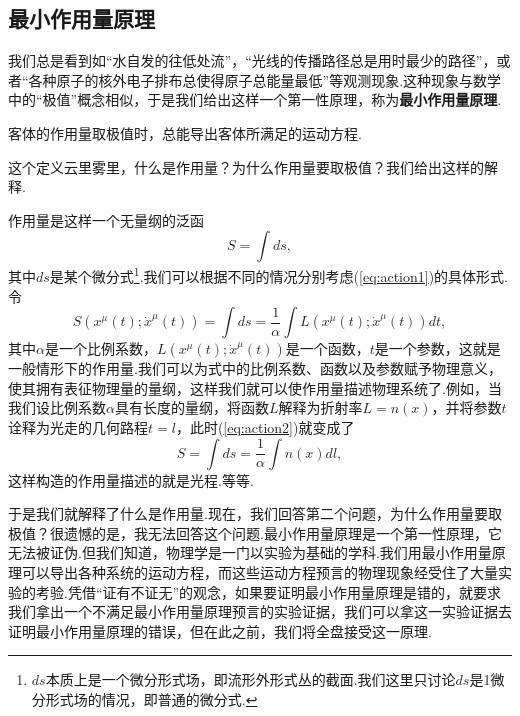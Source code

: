 	\subsection{最小作用量原理}
		我们总是看到如“水自发的往低处流”，“光线的传播路径总是用时最少的路径”，或者“各种原子的核外电子排布总使得原子总能量最低”等观测现象.这种现象与数学中的“极值”概念相似，于是我们给出这样一个第一性原理，称为\textbf{最小作用量原理}.
		\begin{definition}
			客体的作用量取极值时，总能导出客体所满足的运动方程.
		\end{definition}
		这个定义云里雾里，什么是作用量？为什么作用量要取极值？我们给出这样的解释.
		
		作用量是这样一个无量纲的泛函
		\begin{equation}\label{eq:action1}
			S=\int ds,
		\end{equation}
		其中$ds$是某个微分式\footnote{$ds$本质上是一个微分形式场，即流形外形式丛的截面.我们这里只讨论$ds$是1微分形式场的情况，即普通的微分式.}.我们可以根据不同的情况分别考虑(\ref{eq:action1})的具体形式.令
		\begin{equation}\label{eq:action2}
			S(x^\mu(t);\dot{x}^\mu(t))=\int ds=\frac{1}{\alpha}\int L(x^\mu(t);\dot{x}^\mu(t))dt,
		\end{equation}
		其中$\alpha$是一个比例系数，$L(x^\mu(t);\dot{x}^\mu(t))$是一个函数，$t$是一个参数，这就是一般情形下的作用量.我们可以为式中的比例系数、函数以及参数赋予物理意义，使其拥有表征物理量的量纲，这样我们就可以使作用量描述物理系统了.例如，当我们设比例系数$\alpha$具有长度的量纲，将函数$L$解释为折射率$L=n(x)$，并将参数$t$诠释为光走的几何路程$t=l$，此时(\ref{eq:action2})就变成了
		$$S=\int ds=\frac{1}{\alpha}\int n(x)dl,$$
		这样构造的作用量描述的就是光程.等等.

		于是我们就解释了什么是作用量.现在，我们回答第二个问题，为什么作用量要取极值？很遗憾的是，我无法回答这个问题.最小作用量原理是一个第一性原理，它无法被证伪.但我们知道，物理学是一门以实验为基础的学科.我们用最小作用量原理可以导出各种系统的运动方程，而这些运动方程预言的物理现象经受住了大量实验的考验.凭借“证有不证无”的观念，如果要证明最小作用量原理是错的，就要求我们拿出一个不满足最小作用量原理预言的实验证据，我们可以拿这一实验证据去证明最小作用量原理的错误，但在此之前，我们将全盘接受这一原理.

